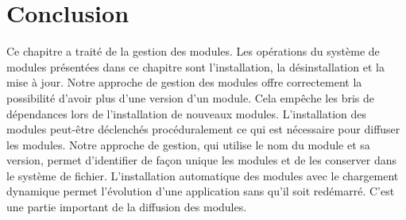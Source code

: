 \section{Conclusion}
%
Ce chapitre a traité de la gestion des modules.  Les opérations du système de
modules présentées dans ce chapitre sont l'installation, la désinstallation et
la mise à jour.  Notre approche de gestion des modules offre correctement la
possibilité d'avoir plus d'une version d'un module. Cela empêche les bris de
dépendances lors de l'installation de nouveaux modules.  L'installation des
modules peut-être déclenchés procéduralement ce qui est nécessaire pour diffuser
les modules. Notre approche de gestion, qui utilise le nom du module et sa
version, permet d'identifier de façon unique les modules et de les conserver
dans le système de fichier. L'installation automatique des modules avec le
chargement dynamique permet l'évolution d'une application sans qu'il soit
redémarré. C'est une partie important de la diffusion des modules.

